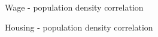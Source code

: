 \documentclass[10pt,a4paper]{article}
\begin{document}
\begin{figure}[H]
  \centering
  
  \caption{Wage - population density correlation}
  \label{dg:wage-pop}
\end{figure}

\begin{figure}[H]
  \centering
  
  \caption{Housing - population density correlation}
  \label{dg:housing-pop}
\end{figure}

\newpage
\listoftables
\listoffigures
\printbibliography

\end{document}
